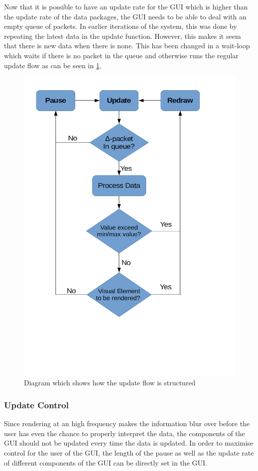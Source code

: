Now that it is possible to have an update rate for the GUI which is higher than the update rate of the data packages, the GUI needs to be able to deal with an empty queue of packets. In earlier iterations of the system, this was done by repeating the latest data in the update function. However, this makes it seem that there is new data when there is none. This has been changed in a wait-loop which waits if there is no packet in the queue and otherwise runs the regular update flow as can be seen in \ref{fig:UpdateFlow}. 
\begin{figure}[H]
	\centering
	\includegraphics[width=.75\textwidth]{images/UpdateFlow}
	\caption{Diagram which shows how the update flow is structured} 
	\label{fig:UpdateFlow}
\end{figure} 

\subsubsection{Update Control}
Since rendering at an high frequency makes the information blur over before the user has even the chance to properly interpret the data, the components of the GUI should not be updated every time the data is updated. In order to maximise control for the user of the GUI, the length of the pause as well as the update rate of different components of the GUI can be directly set in the GUI. 




